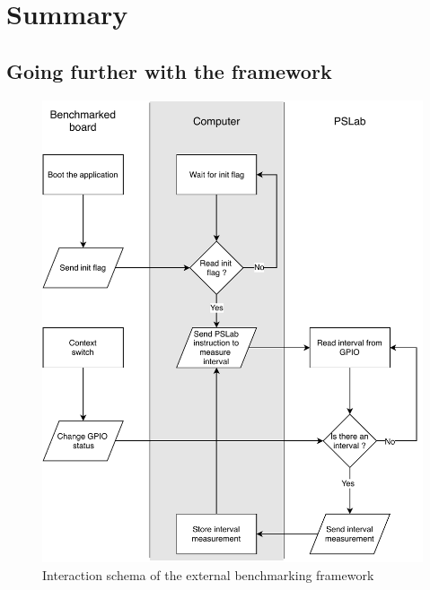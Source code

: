 \section{Summary}

\subsection{Going further with the framework}

\begin{figure}[!ht]
  \centering
  \includegraphics[scale=1]{assets/external-protocol.pdf}
  \caption{\label{fig:external-benchmarking-framework-schema}Interaction schema of the external benchmarking framework}
\end{figure}